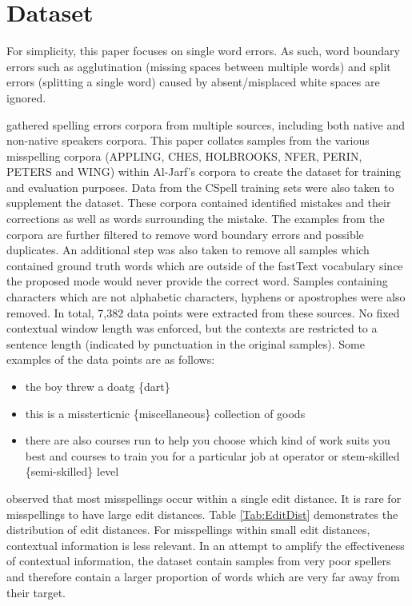 \documentclass[11pt,a4paper]{article}
\begin{document}
\section{Dataset}
For simplicity, this paper focuses on single word errors. As such, word boundary errors such as agglutination (missing spaces between multiple words) and split errors (splitting a single word) caused by absent/misplaced white spaces are ignored. 

\citet{DataSpelling} gathered spelling errors corpora from multiple sources, including both native and non-native speakers corpora. This paper collates samples from the various misspelling corpora (APPLING, CHES, HOLBROOKS, NFER, PERIN, PETERS and WING) within Al-Jarf's corpora to create the dataset for training and evaluation purposes. Data from the CSpell training sets \cite{CSpell} were also taken to supplement the dataset. These corpora contained identified mistakes and their corrections as well as words surrounding the mistake. The examples from the corpora are further filtered to remove word boundary errors and possible duplicates. An additional step was also taken to remove all samples which contained ground truth words which are outside of the fastText vocabulary since the proposed mode would never provide the correct word. Samples containing characters which are not alphabetic characters, hyphens or apostrophes were also removed. In total, 7,382 data points were extracted from these sources. No fixed contextual window length was enforced, but the contexts are restricted to a sentence length (indicated by punctuation in the original samples). Some examples of the data points are as follows:
\begin{itemize}
  \item the boy threw a doatg \{dart\} 
  \item this is a missterticnic \{miscellaneous\} collection of goods
  \item there are also courses run to help you choose which kind of work suits you best and courses to train you for a particular job at operator or stem-skilled \{semi-skilled\} level
\end{itemize}

\citet{fourcontext} observed that most misspellings occur within a single edit distance. It is rare for misspellings to have large edit distances. Table \ref{Tab:EditDist} demonstrates the distribution of edit distances. For misspellings within small edit distances, contextual information is less relevant. In an attempt to amplify the effectiveness of contextual information, the dataset contain samples from very poor spellers and therefore contain a larger proportion of words which are very far away from their target.
\end{document}

